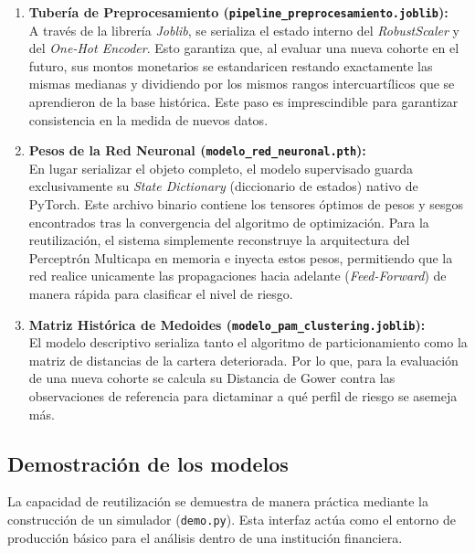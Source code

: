 \begin{enumerate}
	\item \textbf{Tubería de Preprocesamiento (\texttt{pipeline\_preprocesamiento.joblib}):} \\
	A través de la librería \textit{Joblib}, se serializa el estado interno del \textit{RobustScaler} y del \textit{One-Hot Encoder}. Esto garantiza que, al evaluar una nueva cohorte en el futuro, sus montos monetarios se estandaricen restando exactamente las mismas medianas y dividiendo por los mismos rangos intercuartílicos que se aprendieron de la base histórica. Este paso es imprescindible para garantizar consistencia en la medida de nuevos datos.
	
	\item \textbf{Pesos de la Red Neuronal (\texttt{modelo\_red\_neuronal.pth}):} \\
	En lugar serializar el objeto completo, el modelo supervisado guarda exclusivamente su \textit{State Dictionary} (diccionario de estados) nativo de PyTorch. Este archivo binario contiene los tensores óptimos de pesos y sesgos encontrados tras la convergencia del algoritmo de optimización. Para la reutilización, el sistema simplemente reconstruye la arquitectura del Perceptrón Multicapa en memoria e inyecta estos pesos, permitiendo que la red realice unicamente las propagaciones hacia adelante (\textit{Feed-Forward}) de manera rápida para clasificar el nivel de riesgo.
	
	\item \textbf{Matriz Histórica de Medoides (\texttt{modelo\_pam\_clustering.joblib}):} \\
	El modelo descriptivo serializa tanto el algoritmo de particionamiento como la matriz de distancias de la cartera deteriorada. Por lo que, para la evaluación de una nueva cohorte se calcula su Distancia de Gower contra las observaciones de referencia para dictaminar a qué perfil de riesgo se asemeja más.
\end{enumerate}

\subsection{Demostración de los modelos}
La capacidad de reutilización se demuestra de manera práctica mediante la construcción de un simulador (\texttt{demo.py}). Esta interfaz actúa como el entorno de producción básico para el análisis dentro de una institución financiera.

